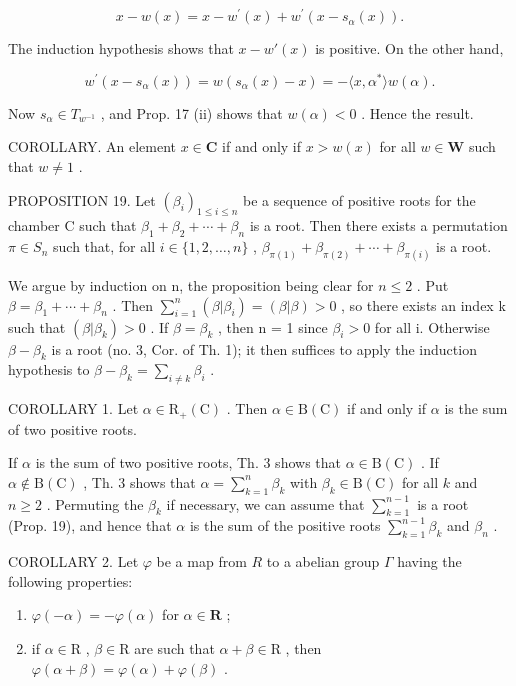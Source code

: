 \[
x - w (x) = x - w ^ {\prime} (x) + w ^ {\prime} \left(x - s _ {\alpha} (x)\right).
\]

The induction hypothesis shows that \(x - w'(x)\) is positive. On the other hand,

\[
w ^ {\prime} (x - s _ {\alpha} (x)) = w \left(s _ {\alpha} (x) - x\right) = - \langle x, \alpha^ {*} \rangle w (\alpha).
\]

Now \(s_{\alpha} \in T_{w^{-1}}\) , and Prop. 17 (ii) shows that \(w(\alpha) < 0\) . Hence the result.

COROLLARY. An element \(x \in \mathbf{C}\) if and only if \(x > w(x)\) for all \(w \in \mathbf{W}\) such that \(w \neq 1\) .

PROPOSITION 19. Let \((\beta_{i})_{1\leqslant i\leqslant n}\) be a sequence of positive roots for the chamber C such that \(\beta_{1}+\beta_{2}+\cdots+\beta_{n}\) is a root. Then there exists a permutation \(\pi\in S_{n}\) such that, for all \(i\in\{1,2,\ldots,n\}\) , \(\beta_{\pi(1)}+\beta_{\pi(2)}+\cdots+\beta_{\pi(i)}\) is a root.

We argue by induction on n, the proposition being clear for \(n \leqslant 2\) . Put \(\beta = \beta_{1} + \cdots + \beta_{n}\) . Then \(\sum_{i=1}^{n} (\beta | \beta_{i}) = (\beta | \beta) > 0\) , so there exists an index k such that \((\beta | \beta_{k}) > 0\) . If \(\beta = \beta_{k}\) , then n = 1 since \(\beta_{i} > 0\) for all i. Otherwise \(\beta - \beta_{k}\) is a root (no. 3, Cor. of Th. 1); it then suffices to apply the induction hypothesis to \(\beta - \beta_{k} = \sum_{i \neq k} \beta_{i}\) .

COROLLARY 1. Let \(\alpha \in \mathrm{R}_{+}(\mathrm{C})\) . Then \(\alpha \in \mathrm{B}(\mathrm{C})\) if and only if \(\alpha\) is the sum of two positive roots.

If \(\alpha\) is the sum of two positive roots, Th. 3 shows that \(\alpha \in \mathrm{B}(\mathrm{C})\) . If \(\alpha \notin \mathrm{B}(\mathrm{C})\) , Th. 3 shows that \(\alpha = \sum_{k=1}^{n} \beta_k\) with \(\beta_k \in \mathrm{B}(\mathrm{C})\) for all \(k\) and \(n \geqslant 2\) . Permuting the \(\beta_k\) if necessary, we can assume that \(\sum_{k=1}^{n-1}\) is a root (Prop. 19), and hence that \(\alpha\) is the sum of the positive roots \(\sum_{k=1}^{n-1} \beta_k\) and \(\beta_n\) .

COROLLARY 2. Let \(\varphi\) be a map from \(R\) to a abelian group \(\Gamma\) having the following properties:

\begin{enumerate}
\def\labelenumi{\arabic{enumi})}
\item
  \(\varphi(-\alpha) = -\varphi(\alpha)\) for \(\alpha \in \mathbf{R}\) ;
\item
  if \(\alpha \in \mathrm{R}\) , \(\beta \in \mathrm{R}\) are such that \(\alpha + \beta \in \mathrm{R}\) , then \(\varphi(\alpha + \beta) = \varphi(\alpha) + \varphi(\beta)\) .
\end{enumerate}

